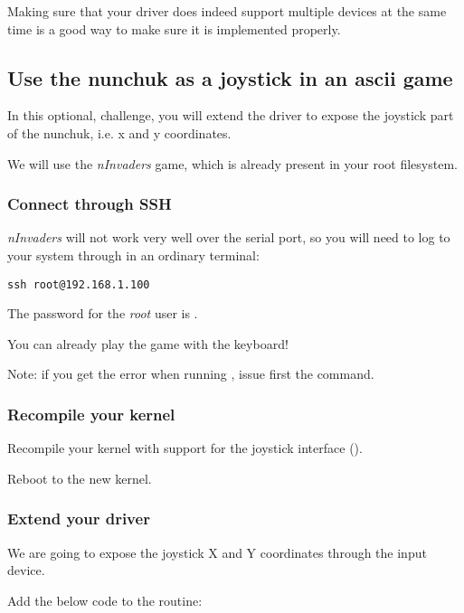 Making sure that your driver does indeed support multiple devices at the
same time is a good way to make sure it is implemented properly.

\subsection{Use the nunchuk as a joystick in an ascii game}

In this optional, challenge, you will extend the driver to expose
the joystick part of the nunchuk, i.e. x and y coordinates.

We will use the {\em nInvaders} game, which is already present in
your root filesystem.

\subsubsection{Connect through SSH}

{\em nInvaders} will not work very well over the serial port,
so you will need to log to your system through  in an
ordinary terminal:

\begin{verbatim}
ssh root@192.168.1.100
\end{verbatim}

The password for the {\em root} user is .

You can already play the  game with
the keyboard!

Note: if you get the error 
when running , issue first the
 command.

\subsubsection{Recompile your kernel}

Recompile your kernel with support for the joystick interface
().

Reboot to the new kernel.

\subsubsection{Extend your driver}

We are going to expose the joystick X and Y coordinates through
the input device.

Add the below code to the  routine:

